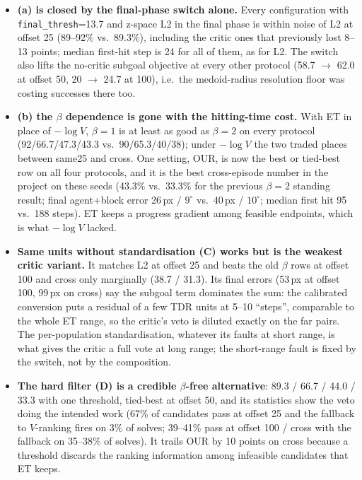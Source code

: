 \documentclass[11pt]{article}
\begin{document}
\begin{itemize}[nosep]
  \item \textbf{(a) is closed by the final-phase switch alone.} Every configuration with
        \texttt{final\_thresh}=13.7 and z-space L2 in the final phase is within noise of L2
        at offset 25 (89--92\% vs.\ 89.3\%), including the critic ones that previously lost
        8--13 points; median first-hit step is 24 for all of them, as for L2. The switch also
        lifts the no-critic subgoal objective at every other protocol (58.7 $\to$ 62.0 at
        offset 50, 20 $\to$ 24.7 at 100), i.e.\ the medoid-radius resolution floor was costing
        successes there too.
  \item \textbf{(b) the $\beta$ dependence is gone with the hitting-time cost.} With ET in
        place of $-\log V$, $\beta=1$ is at least as good as $\beta=2$ on every protocol
        (92/66.7/47.3/43.3 vs.\ 90/65.3/40/38); under $-\log V$ the two traded places between
        same25 and cross. One setting, OUR, is now the best or tied-best row on all four
        protocols, and it is the best cross-episode number in the project on these seeds
        (43.3\% vs.\ 33.3\% for the previous $\beta=2$ standing result; final agent+block
        error 26\,px / $9^\circ$ vs.\ 40\,px / $10^\circ$; median first hit 95 vs.\ 188 steps).
        ET keeps a progress gradient among feasible endpoints, which is what $-\log V$ lacked.
  \item \textbf{Same units without standardisation (C) works but is the weakest critic
        variant.} It matches L2 at offset 25 and beats the old $\beta$ rows at offset 100 and
        cross only marginally (38.7 / 31.3). Its final errors (53\,px at offset 100, 99\,px on
        cross) say the subgoal term dominates the sum: the calibrated conversion puts a residual
        of a few TDR units at 5--10 ``steps'', comparable to the whole ET range, so the critic's
        veto is diluted exactly on the far pairs. The per-population standardisation, whatever
        its faults at short range, is what gives the critic a full vote at long range; the
        short-range fault is fixed by the switch, not by the composition.
  \item \textbf{The hard filter (D) is a credible $\beta$-free alternative}: 89.3 / 66.7 /
        44.0 / 33.3 with one threshold, tied-best at offset 50, and its statistics show the
        veto doing the intended work (67\% of candidates pass at offset 25 and the fallback
        to $V$-ranking fires on 3\% of solves; 39--41\% pass at offset 100 / cross with the
        fallback on 35--38\% of solves). It trails OUR by 10 points on cross because a
        threshold discards the ranking information among infeasible candidates that ET keeps.
\end{itemize}
\end{document}

